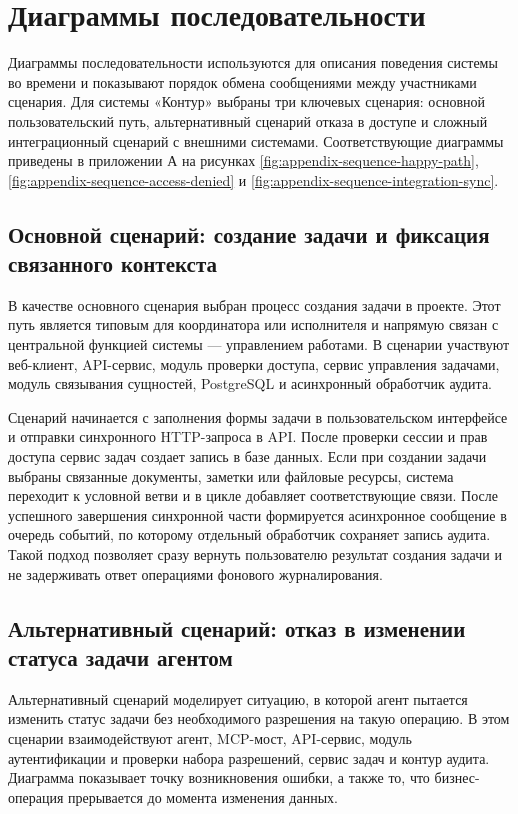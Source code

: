 \section{Диаграммы последовательности}
\headingtextsep

Диаграммы последовательности используются для описания поведения системы во времени и показывают порядок обмена сообщениями между участниками сценария. Для системы «Контур» выбраны три ключевых сценария: основной пользовательский путь, альтернативный сценарий отказа в доступе и сложный интеграционный сценарий с внешними системами. Соответствующие диаграммы приведены в приложении А на рисунках \ref{fig:appendix-sequence-happy-path}, \ref{fig:appendix-sequence-access-denied} и \ref{fig:appendix-sequence-integration-sync}.

\textheadingsep
\subsection{Основной сценарий: создание задачи и фиксация связанного контекста}
\headingtextsep

В качестве основного сценария выбран процесс создания задачи в проекте. Этот путь является типовым для координатора или исполнителя и напрямую связан с центральной функцией системы --- управлением работами. В сценарии участвуют веб-клиент, API-сервис, модуль проверки доступа, сервис управления задачами, модуль связывания сущностей, PostgreSQL и асинхронный обработчик аудита.

Сценарий начинается с заполнения формы задачи в пользовательском интерфейсе и отправки синхронного HTTP-запроса в API. После проверки сессии и прав доступа сервис задач создает запись в базе данных. Если при создании задачи выбраны связанные документы, заметки или файловые ресурсы, система переходит к условной ветви и в цикле добавляет соответствующие связи. После успешного завершения синхронной части формируется асинхронное сообщение в очередь событий, по которому отдельный обработчик сохраняет запись аудита. Такой подход позволяет сразу вернуть пользователю результат создания задачи и не задерживать ответ операциями фонового журналирования.

\textheadingsep
\subsection{Альтернативный сценарий: отказ в изменении статуса задачи агентом}
\headingtextsep

Альтернативный сценарий моделирует ситуацию, в которой агент пытается изменить статус задачи без необходимого разрешения на такую операцию. В этом сценарии взаимодействуют агент, MCP-мост, API-сервис, модуль аутентификации и проверки набора разрешений, сервис задач и контур аудита. Диаграмма показывает точку возникновения ошибки, а также то, что бизнес-операция прерывается до момента изменения данных.

